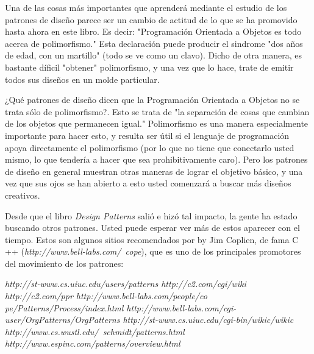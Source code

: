 \documentclass{article}
\begin{document}
Una de las cosas más importantes que aprenderá mediante el estudio de los patrones de diseño parece ser  un cambio de actitud de lo que se ha promovido hasta ahora en este libro. Es decir: "Programación Orientada a Objetos es todo acerca de polimorfismo." Esta declaración puede producir el sindrome "dos años de edad, con un martillo"  (todo se ve como un clavo). Dicho de otra manera, es bastante díficil "obtener" polimorfismo, y una vez que lo hace, trate de emitir  %
todos sus diseños en un molde particular.\newline

¿Qué patrones de diseño dicen que la Programación Orientada a Objetos no se trata sólo de polimorfismo?. Esto se trata de "la separación de cosas que cambian de los objetos que permanecen igual." Polimorfismo es una manera especialmente importante para hacer esto, y resulta ser útil si el lenguaje de programación apoya directamente el polimorfismo (por lo que no tiene que conectarlo usted mismo, lo que tendería a hacer que sea prohibitivamente caro). Pero los patrones de diseño en general muestran otras maneras de lograr el objetivo básico, y una vez que sus ojos se han abierto a esto usted comenzará a buscar más diseños creativos.\newline

Desde que el libro \textit{Design Patterns} salió e hizó tal impacto, la gente ha estado buscando otros patrones. Usted puede esperar ver más de estos aparecer con el tiempo. Estos son algunos sitios recomendados por by Jim Coplien, de fama C ++ (\textit{http://www.bell-labs.com/~cope}), que es uno de los principales promotores del movimiento de los patrones:      \newline

\textit{http://st-www.cs.uiuc.edu/users/patterns \newline
http://c2.com/cgi/wiki \newline
http://c2.com/ppr  \newline
http://www.bell-labs.com/people/co \newline
pe/Patterns/Process/index.html  \newline
http://www.bell-labs.com/cgi-user/OrgPatterns/OrgPatterns  \newline
http://st-www.cs.uiuc.edu/cgi-bin/wikic/wikic  \newline
http://www.cs.wustl.edu/~schmidt/patterns.html  \newline
http://www.espinc.com/patterns/overview.html } \newline
\end{document}
